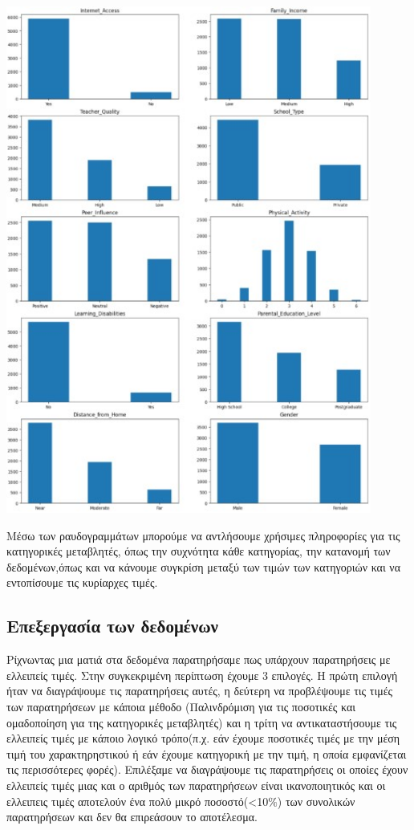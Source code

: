 \documentclass[12pt]{article}
\begin{document}
\begin{center}
    \includegraphics[width=0.9\textwidth]{./images/icon15.jpg}
    
\end{center}

Μέσω των ραυδογραμμάτων μπορούμε να αντλήσουμε χρήσιμες πληροφορίες για τις κατηγορικές μεταβλητές, όπως την συχνότητα κάθε κατηγορίας, την κατανομή των δεδομένων,όπως και να κάνουμε συγκρίση μεταξύ των τιμών των κατηγοριών και να εντοπίσουμε τις κυρίαρχες τιμές.

\subsection{Επεξεργασία των δεδομένων}
Ρίχνωντας μια ματιά στα δεδομένα παρατηρήσαμε πως υπάρχουν παρατηρήσεις με ελλειπείς τιμές. Στην συγκεκριμένη περίπτωση έχουμε 3 επιλογές. Η πρώτη επιλογή ήταν να διαγράψουμε τις παρατηρήσεις αυτές, η δεύτερη να προβλέψουμε τις τιμές των παρατηρήσεων με κάποια μέθοδο (Παλινδρόμιση για τις ποσοτικές και ομαδοποίηση για της κατηγορικές μεταβλητές) και η τρίτη να αντικαταστήσουμε τις ελλειπείς τιμές με κάποιο λογικό τρόπο(π.χ. εάν έχουμε ποσοτικές τιμές με την μέση τιμή του χαρακτηρηστικού ή εάν έχουμε κατηγορική με την τιμή, η οποία εμφανίζεται τις περισσότερες φορές). Επιλέξαμε να διαγράψουμε τις παρατηρήσεις οι οποίες έχουν ελλειπείς τιμές μιας και ο αριθμός των παρατηρήσεων είναι ικανοποιητικός και οι ελλειπεις τιμές αποτελούν ένα πολύ μικρό ποσοστό(<10\(\%\)) των συνολικών παρατηρήσεων και δεν θα επιρεάσουν το αποτέλεσμα. 
\end{document}
